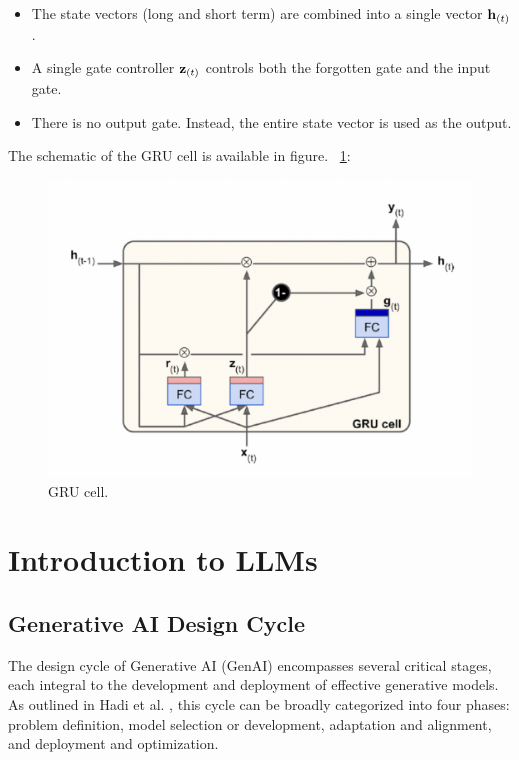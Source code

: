 \begin{itemize}
    \item The state vectors (long and short term) are combined into a single vector ${\bf h}_{(t)}$.
    \item A single gate controller ${\bf z}_{(t)}$ controls both the forgotten gate and the input gate.
    \item There is no output gate. Instead, the entire state vector is used as the output.
\end{itemize}
The schematic of the GRU cell is available in figure. ~\ref{fig:GRU_cell}:
\begin{figure} [h!]
    \centering
    \includegraphics[width=\textwidth,height=\textheight,keepaspectratio]{Assets/Theory_and_methods/unnamed-9.png}
    \caption{GRU cell.}
    \label{fig:GRU_cell}
\end{figure}

\clearpage
\section{Introduction to LLMs}
\subsection{Generative AI Design Cycle}
The design cycle of Generative AI (GenAI) encompasses several critical stages, each integral to the development and deployment of effective generative models. As outlined in Hadi et al. \cite{hadi2024}, this cycle can be broadly categorized into four phases: problem definition, model selection or development, adaptation and alignment, and deployment and optimization.


